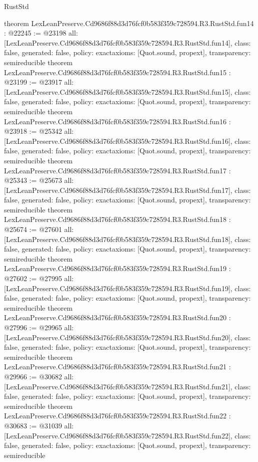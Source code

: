 \begin{lexlean}{RustStd}
\begin{coremodule}
{}
theorem LexLeanPreserve.Cd9686f88d3d76fcf0b583f359c728594.R3.RustStd.fun14 : @22245 := @23198 {
  all: [LexLeanPreserve.Cd9686f88d3d76fcf0b583f359c728594.R3.RustStd.fun14],
  class: false,
  generated: false,
  policy: exact{axioms: [Quot.sound, propext]},
  transparency: semireducible
}
theorem LexLeanPreserve.Cd9686f88d3d76fcf0b583f359c728594.R3.RustStd.fun15 : @23199 := @23917 {
  all: [LexLeanPreserve.Cd9686f88d3d76fcf0b583f359c728594.R3.RustStd.fun15],
  class: false,
  generated: false,
  policy: exact{axioms: [Quot.sound, propext]},
  transparency: semireducible
}
theorem LexLeanPreserve.Cd9686f88d3d76fcf0b583f359c728594.R3.RustStd.fun16 : @23918 := @25342 {
  all: [LexLeanPreserve.Cd9686f88d3d76fcf0b583f359c728594.R3.RustStd.fun16],
  class: false,
  generated: false,
  policy: exact{axioms: [Quot.sound, propext]},
  transparency: semireducible
}
theorem LexLeanPreserve.Cd9686f88d3d76fcf0b583f359c728594.R3.RustStd.fun17 : @25343 := @25673 {
  all: [LexLeanPreserve.Cd9686f88d3d76fcf0b583f359c728594.R3.RustStd.fun17],
  class: false,
  generated: false,
  policy: exact{axioms: [Quot.sound, propext]},
  transparency: semireducible
}
theorem LexLeanPreserve.Cd9686f88d3d76fcf0b583f359c728594.R3.RustStd.fun18 : @25674 := @27601 {
  all: [LexLeanPreserve.Cd9686f88d3d76fcf0b583f359c728594.R3.RustStd.fun18],
  class: false,
  generated: false,
  policy: exact{axioms: [Quot.sound, propext]},
  transparency: semireducible
}
theorem LexLeanPreserve.Cd9686f88d3d76fcf0b583f359c728594.R3.RustStd.fun19 : @27602 := @27995 {
  all: [LexLeanPreserve.Cd9686f88d3d76fcf0b583f359c728594.R3.RustStd.fun19],
  class: false,
  generated: false,
  policy: exact{axioms: [Quot.sound, propext]},
  transparency: semireducible
}
theorem LexLeanPreserve.Cd9686f88d3d76fcf0b583f359c728594.R3.RustStd.fun20 : @27996 := @29965 {
  all: [LexLeanPreserve.Cd9686f88d3d76fcf0b583f359c728594.R3.RustStd.fun20],
  class: false,
  generated: false,
  policy: exact{axioms: [Quot.sound, propext]},
  transparency: semireducible
}
theorem LexLeanPreserve.Cd9686f88d3d76fcf0b583f359c728594.R3.RustStd.fun21 : @29966 := @30682 {
  all: [LexLeanPreserve.Cd9686f88d3d76fcf0b583f359c728594.R3.RustStd.fun21],
  class: false,
  generated: false,
  policy: exact{axioms: [Quot.sound, propext]},
  transparency: semireducible
}
theorem LexLeanPreserve.Cd9686f88d3d76fcf0b583f359c728594.R3.RustStd.fun22 : @30683 := @31039 {
  all: [LexLeanPreserve.Cd9686f88d3d76fcf0b583f359c728594.R3.RustStd.fun22],
  class: false,
  generated: false,
  policy: exact{axioms: [Quot.sound, propext]},
  transparency: semireducible
}
\end{coremodule}
\end{lexlean}
